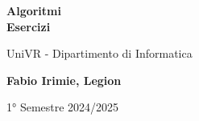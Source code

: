 \begin{titlepage}
	\begin{center}
		\vspace*{1cm}

		\Huge
		\textbf{Algoritmi\\Esercizi}

		\vspace{0.5cm}
		\LARGE
		UniVR - Dipartimento di Informatica

		\vspace{1.5cm}

		\textbf{Fabio Irimie, Legion}

		\vfill


		\vspace{0.8cm}


		1° Semestre 2024/2025

	\end{center}
\end{titlepage}
